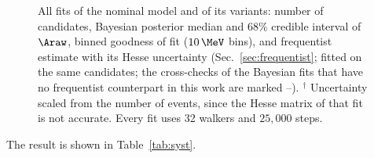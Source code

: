\begin{figure}[!t]
\caption{All fits of the nominal model and of its variants: number of candidates, Bayesian posterior median and 68\% credible interval of $\Araw$, binned goodness of fit ($10\,\MeV$ bins), and frequentist estimate with its Hesse uncertainty (Sec.~\ref{sec:frequentist}; fitted on the same candidates; the cross-checks of the Bayesian fits that have no frequentist counterpart in this work are marked --). $^\dagger$ Uncertainty scaled from the number of events, since the Hesse matrix of that fit is not accurate. Every fit uses 32 walkers and $25{,}000$ steps.}
\label{tab:bayes_all}
\end{figure}

The result is shown in Table~\ref{tab:syst}.

